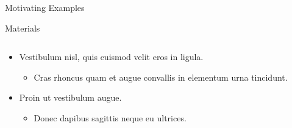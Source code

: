 \documentclass[final,hyperref={pdfpagelabels=false}]{beamer}
\begin{document}
\begin{frame}[t]
\begin{columns}[t]
\begin{column}{.465\textwidth}
\begin{block}{Motivating Examples}
            \end{block}


            \begin{block}{Materials}

                \begin{columns} %
                    \begin{column}{.54\textwidth} %
                        \begin{itemize}
                            \item Vestibulum nisl, quis euismod velit eros in ligula.
                                  \begin{itemize}
                                      \item Cras rhoncus quam et augue convallis in elementum urna tincidunt.
                                  \end{itemize}
                            \item Proin ut vestibulum augue.
                                  \begin{itemize}
                                      \item Donec dapibus sagittis neque eu ultrices.
                                  \end{itemize}
                        \end{itemize}
                    \end{column}


\end{columns}
\end{block}
\end{column}
\end{columns}
\end{frame}
\end{document}
